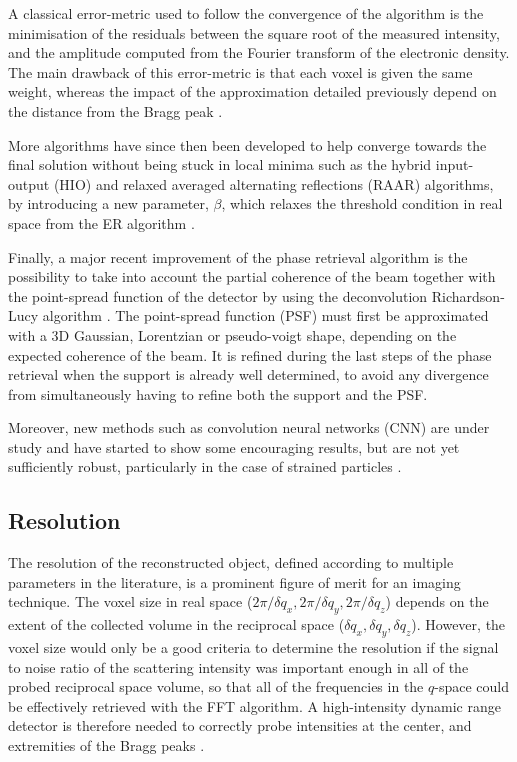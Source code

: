 A classical error-metric used to follow the convergence of the algorithm is the minimisation of the residuals between the square root of the measured intensity, and the amplitude computed from the Fourier transform of the electronic density.
The main drawback of this error-metric is that each voxel is given the same weight, whereas the impact of the approximation detailed previously depend on the distance from the Bragg peak \parencite{Godard2021}.

More algorithms have since then been developed to help converge towards the final solution without being stuck in local minima such as the hybrid input-output (HIO) and relaxed averaged alternating reflections (RAAR) algorithms, by introducing a new parameter, $\beta$, which relaxes the threshold condition in real space from the ER algorithm \parencite{Marchesini2003, Luke2005, Marchesini2007}.

Finally, a major recent improvement of the phase retrieval algorithm is the possibility to take into account the partial coherence of the beam \parencite{Sinha1998, Vartanyants2001, Williams2007, Whitehead2009, Nugent2010, ChenBo2012} together with the point-spread function of the detector by using the deconvolution Richardson-Lucy algorithm \parencite{Richardson1972, Lucy1974, Fish1995, Clark2012}.
The point-spread function (PSF) must first be approximated with a 3D Gaussian, Lorentzian or pseudo-voigt shape, depending on the expected coherence of the beam.
It is refined during the last steps of the phase retrieval when the support is already well determined, to avoid any divergence from simultaneously having to refine both the support and the PSF.

Moreover, new methods such as convolution neural networks (CNN) are under study and have started to show some encouraging results, but are not yet sufficiently robust, particularly in the case of strained particles \parencite{Cherukara2018, Shen2019, Chan2021, Kim2021a, Wu2021a}.

\subsection{Resolution}

The resolution of the reconstructed object, defined according to multiple parameters in the literature, is a prominent figure of merit for an imaging technique.
The voxel size in real space ($2\pi / \delta q_x, 2\pi / \delta q_y, 2\pi / \delta q_z$) depends on the extent of the collected volume in the reciprocal space ($\delta q_x, \delta q_y, \delta q_z$).
However, the voxel size would only be a good criteria to determine the resolution if the signal to noise ratio of the scattering intensity was important enough in all of the probed reciprocal space volume, so that all of the frequencies in the $q$-space could be effectively retrieved with the FFT algorithm.
A high-intensity dynamic range detector is therefore needed to correctly probe intensities at the center, and extremities of the Bragg peaks \parencite{Latychevskaia2018}.

